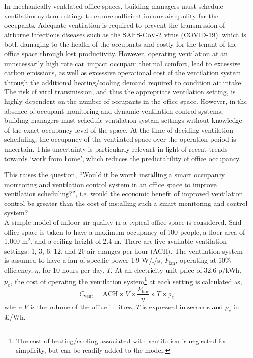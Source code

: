 In mechanically ventilated office spaces, building managers must schedule ventilation system settings to ensure sufficient indoor air quality for the occupants. Adequate ventilation is required to prevent the transmission of airborne infectious diseases such as the SARS-CoV-2 virus (COVID-19), which is both damaging to the health of the occupants and costly for the tenant of the office space through lost productivity. However, operating ventilation at an unnecessarily high rate can impact occupant thermal comfort, lead to excessive carbon emissions, as well as excessive operational cost of the ventilation system through the additional heating/cooling demand required to condition air intake. The risk of viral transmission, and thus the appropriate ventilation setting, is highly dependent on the number of occupants in the office space. However, in the absence of occupant monitoring and dynamic ventilation control systems, building managers must schedule ventilation system settings without knowledge of the exact occupancy level of the space. At the time of deciding ventilation scheduling, the occupancy of the ventilated space over the operation period is uncertain. This uncertainty is particularly relevant in light of recent trends towards `work from home', which reduces the predictability of office occupancy.

This raises the question, ``Would it be worth installing a smart occupancy monitoring and ventilation control system in an office space to improve ventilation scheduling?'', i.e. would the economic benefit of improved ventilation control be greater than the cost of installing such a smart monitoring and control system?\\

A simple model of indoor air quality in a typical office space is considered. Said office space is taken to have a maximum occupancy of 100 people, a floor area of 1,000 m$^2$, and a ceiling height of 2.4 m. There are five available ventilation settings: 1, 3, 6, 12, and 20 air changes per hour (ACH). The ventilation system is assumed to have a fan of specific power 1.9 W/l/s, $P_{\text{fan}}$, operating at 60\% efficiency, $\eta$, for 10 hours per day, $T$. At an electricity unit price of 32.6 p/kWh, $p_e$, the cost of operating the ventilation system\footnote{The cost of heating/cooling associated with ventilation is neglected for simplicity, but can be readily added to the model.} at each setting is calculated as,
\begin{equation}
    C_{\text{vent}} = \text{ACH} \times V \times \frac{P_{\text{fan}}}{\eta} \times T \times p_e
\end{equation}
where $V$ is the volume of the office in litres, $T$ is expressed in seconds and $p_e$ in £/Wh.

